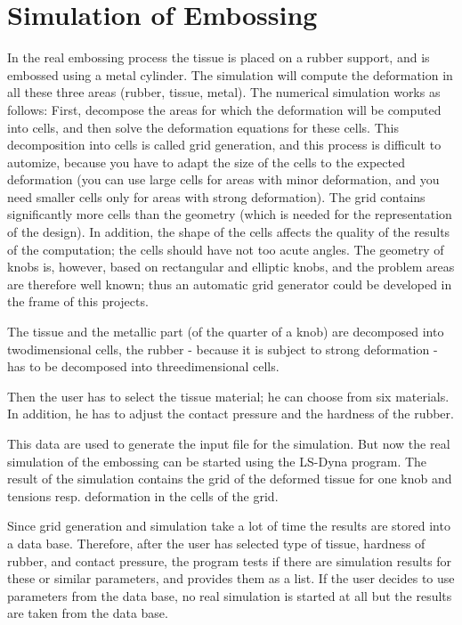\section{Simulation of Embossing}

In the real embossing process the tissue is placed on a rubber support, and 
is embossed using a metal cylinder. The simulation will compute the deformation 
in all these three areas (rubber, tissue, metal). The numerical simulation works 
as follows: First, decompose the areas for which the deformation will be computed 
into cells, and then solve the deformation equations for these cells. This 
decomposition into cells is called grid generation, and this process is difficult 
to automize, because you have to adapt the size of the cells to the expected 
deformation (you can use large cells for areas with minor deformation, and you 
need smaller cells only for areas with strong deformation). The grid contains 
significantly more cells than the geometry (which is needed for the representation 
of the design).  In addition, the shape of the cells affects the quality of the 
results of the computation; the cells should have not too acute angles. The 
geometry of knobs is, however, based on rectangular and elliptic knobs, and 
the problem areas are therefore well known; thus an automatic grid generator 
could be developed in the frame of this projects.

The tissue and the metallic part (of  the quarter of a knob) are decomposed into 
twodimensional cells, the rubber - because it is subject to strong 
deformation - has to be decomposed into threedimensional cells.

Then the user has to select the tissue material; he can choose from six 
materials. In addition, he has to adjust the contact pressure and the hardness 
of the rubber.

This data are used to generate the input file for the simulation. But now the 
real simulation of the embossing can be started using the LS-Dyna program. 
The result of the simulation contains the grid of the deformed tissue for 
one knob and tensions resp. deformation in the cells of the grid.

Since grid generation and simulation take a lot of time the results are stored into 
a data base. Therefore, after the user has selected type of tissue, hardness of 
rubber, and contact pressure, the program tests if there are simulation results 
for these or similar parameters, and provides them as a list. If the user decides 
to use parameters from the data base, no real simulation is started at all but 
the results are taken from the data base. 


